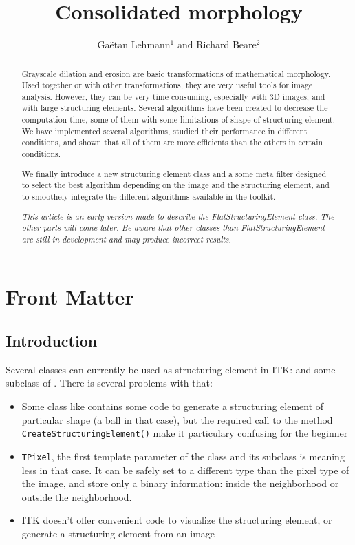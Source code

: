 \documentclass{InsightArticle}
\title{Consolidated morphology}
\author{Ga\"etan Lehmann{$^1$} {\small{and}} Richard Beare{$^2$}}
\begin{document}
\maketitle

\ifhtml
\chapter*{Front Matter\label{front}}
\fi


\begin{abstract}
\noindent
Grayscale dilation and erosion are basic transformations of mathematical
morphology. Used together or with other transformations, they are very useful
tools for image analysis. However, they can be very time consuming, especially
with 3D images, and with large structuring elements. Several algorithms have
been created to decrease the computation time, some of them with some limitations
of shape of structuring element. We have implemented several algorithms, studied
their performance in different conditions, and shown that all of them are more 
efficients than the others in certain conditions.

We finally introduce a new structuring element class and a some meta filter designed to
select the best algorithm depending on the image and the structuring element, and
to smoothely integrate the different algorithms available in the toolkit.

{\em This article is an early version made to describe the FlatStructuringElement class.
The other parts will come later. Be aware that other classes than FlatStructuringElement
are still in development and may produce incorrect results.}
\end{abstract}

\tableofcontents

\section{Introduction}

Several classes can currently be used as structuring element in ITK: 
and some subclass of . There is several problems with that:
\begin{itemize}
  \item Some class like 
contains some code to generate a structuring element of particular shape
(a ball in that case), but the required call to the method \verb$CreateStructuringElement()$
make it particulary confusing for the beginner
  \item \verb$TPixel$, the first template parameter
of the  class and its subclass is meaning less in that case. It
can be safely set to a different type than the pixel type of the image, and store
only a binary information: inside the neighborhood or outside the neighborhood.
  \item ITK doesn't offer convenient code to visualize the structuring element,
or generate a structuring element from an image
\end{itemize}
\end{document}
